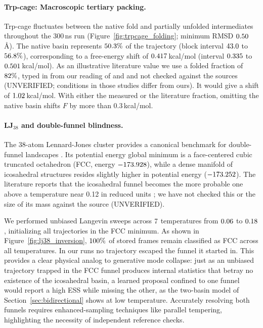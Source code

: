 \paragraph{Trp-cage: Macroscopic tertiary packing.}
Trp-cage fluctuates between the native fold and partially unfolded intermediates throughout the 300\,ns run (Figure~\ref{fig:trpcage_folding}; minimum RMSD $0.50$\,\AA). The native basin represents $50.3\%$ of the trajectory (block interval $43.0$ to $56.8\%$), corresponding to a free-energy shift of $0.417$\,kcal/mol (interval $0.335$ to $0.501$\,kcal/mol). As an illustrative literature value we use a folded fraction of $82\%$, typed in from our reading of \citet{neidigh2002trpcage} and \citet{lindorff2011fastfolding} and not checked against the sources (UNVERIFIED; conditions in those studies differ from ours). It would give a shift of $1.02$\,kcal/mol. With either the measured or the literature fraction, omitting the native basin shifts $F$ by more than 0.3\,kcal/mol.

\paragraph{LJ$_{38}$ and double-funnel blindness.}
The 38-atom Lennard-Jones cluster provides a canonical benchmark for double-funnel landscapes \citep{doye1999lj38,wales1999lj38}. Its potential energy global minimum is a face-centered cubic truncated octahedron (FCC, energy $-173.928$), while a dense manifold of icosahedral structures resides slightly higher in potential energy ($-173.252$). The literature reports that the icosahedral funnel becomes the more probable one above a temperature near 0.12 in reduced units \citep{doye1999lj38}; we have not checked this or the size of its mass against the source (UNVERIFIED). 

We performed unbiased Langevin sweeps across $7$ temperatures from $0.06$ to $0.18$, initializing all trajectories in the FCC minimum. As shown in Figure~\ref{fig:lj38_inversion}, $100\%$ of stored frames remain classified as FCC across all temperatures. In our runs no trajectory escaped the funnel it started in. This provides a clear physical analog to generative mode collapse: just as an unbiased trajectory trapped in the FCC funnel produces internal statistics that betray no existence of the icosahedral basin, a learned proposal confined to one funnel would report a high ESS while missing the other, as the two-basin model of Section~\ref{sec:bidirectional} shows at low temperature. Accurately resolving both funnels requires enhanced-sampling techniques like parallel tempering, highlighting the necessity of independent reference checks.